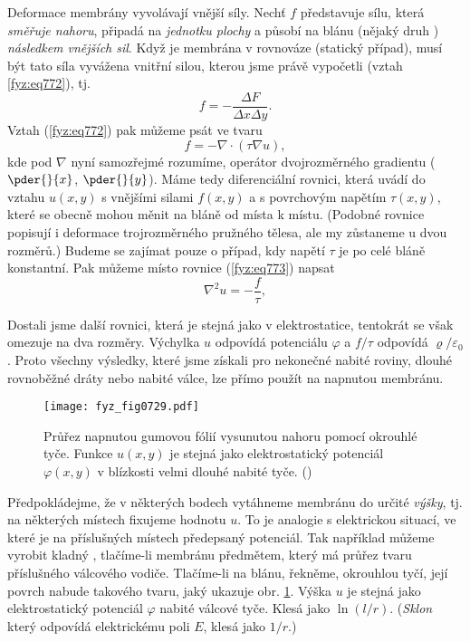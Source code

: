     Deformace membrány vyvolávají vnější síly. Nechť \(f\) představuje sílu, která \emph{směřuje
    nahoru}, připadá na \emph{jednotku plochy} a působí na blánu (nějaký druh )
    \emph{následkem vnějších sil}. Když je membrána v rovnováze (statický případ), musí být tato
    síla vyvážena vnitřní silou, kterou jsme právě vypočetli (vztah \ref{fyz:eq772}), tj.
    \begin{equation*}
      f = -\dfrac{\Delta F}{\Delta x\Delta y}.
    \end{equation*}
    Vztah (\ref{fyz:eq772}) pak můžeme psát ve tvaru
    \begin{equation}\label{fyz:eq773}
      f = -\nabla\cdot(\tau\nabla u),
    \end{equation}   
    kde pod \(\nabla\) nyní samozřejmé rozumíme, operátor dvojrozměrného gradientu (\(\pder{}{x}\),
    \(\pder{}{y}\)). Máme tedy diferenciální rovnici, která uvádí do vztahu \(u(x, y)\) s vnějšími
    silami \(f(x, y)\) a s povrchovým napětím \(\tau(x, y)\), které se obecně mohou měnit na bláně
    od místa k místu. (Podobné rovnice popisují i deformace trojrozměrného pružného tělesa, ale my
    zůstaneme u dvou rozměrů.) Budeme se zajímat pouze o případ, kdy napětí \(\tau\) je po celé
    bláně konstantní. Pak můžeme místo rovnice (\ref{fyz:eq773}) napsat
    \begin{equation}\label{fyz:eq774}
      \nabla^2u = -\dfrac{f}{\tau},
    \end{equation}   

    Dostali jsme další rovnici, která je stejná jako v elektrostatice, tentokrát se však omezuje na
    dva rozměry. Výchylka \(u\) odpovídá potenciálu \(\varphi\) a \(f/\tau\) odpovídá
    \(\varrho/\varepsilon_0\). Proto všechny výsledky, které jsme získali pro nekonečné nabité
    roviny, dlouhé rovnoběžné dráty nebo nabité válce, lze přímo použít na napnutou membránu.

    \begin{figure}[ht!] %
      \centering
      \texttt{[image: fyz\_fig0729.pdf]}
      \caption{Průřez napnutou gumovou fólií vysunutou nahoru pomocí okrouhlé tyče. Funkce \(u(x,
        y)\) je stejná jako elektrostatický potenciál \(\varphi(x, y)\) v blízkosti velmi dlouhé
        nabité tyče. (\cite[s.~213]{Feynman02})}
      \label{fyz:fig0729}
    \end{figure}

    Předpokládejme, že v některých bodech vytáhneme membránu do určité \emph{výšky}, tj. na
    některých místech fixujeme hodnotu \(u\). To je analogie s elektrickou situací, ve které je na
    příslušných místech předepsaný potenciál. Tak například můžeme vyrobit kladný ,
    tlačíme-li membránu předmětem, který má průřez tvaru příslušného válcového vodiče. Tlačíme-li na
    blánu, řekněme, okrouhlou tyčí, její povrch nabude takového tvaru, jaký ukazuje obr.
    \ref{fyz:fig0729}. Výška \(u\) je stejná jako elektrostatický potenciál \(\varphi\) nabité
    válcové tyče. Klesá jako \(\ln(l/r)\). (\emph{Sklon} který odpovídá elektrickému poli \(E\),
    klesá jako \(1/r\).)


